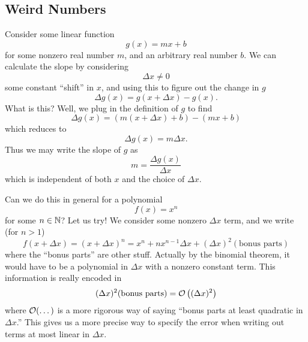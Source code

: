 
\subsection{Weird Numbers}

Consider some linear function
\begin{equation}
g(x)=mx+b
\end{equation}
for some nonzero real number $m$, and an arbitrary real number
$b$. We can calculate the slope by considering
\begin{equation}
 \Delta x\not=0
\end{equation}
some constant ``shift'' in $x$, and using this to figure out the
change in $g$
\begin{equation}
\Delta g(x)=g(x+\Delta x)-g(x).
\end{equation}
What is this? Well, we plug in the definition of $g$ to find
\begin{equation}
\Delta g(x)=(m(x+\Delta x)+b)-(mx+b)
\end{equation}
which reduces to 
\begin{equation}
\Delta g(x)=m\Delta x.
\end{equation}
Thus we may write the slope of $g$ as
\begin{equation}
m=\frac{\Delta g(x)}{\Delta x}
\end{equation}
which is independent of both $x$ and the choice of $\Delta x$.

Can we do this in general for a polynomial
\begin{equation}\label{eq:definitionOfF}
f(x)=x^{n}
\end{equation}
for some $n\in\mathbb{N}$? Let us try! We consider some nonzero $\Delta
x$ term, and we write (for $n>1$)
\begin{equation}
f(x+\Delta x)=(x+\Delta x)^{n}=x^{n}+nx^{n-1}\Delta
x+(\Delta x)^{2}(\mbox{bonus parts})
\end{equation}
where the ``bonus parts'' are other stuff. Actually by the binomial
theorem, it would have to be a polynomial in $\Delta x$ with a
nonzero constant term. This information is really encoded in
\begin{equation}
(\Delta x)^{2}(\mbox{bonus parts})=\mathcal{O}\left((\Delta x)^{2}\right)
\end{equation}
where $\mathcal{O}(\dots)$ is a more rigorous way of saying ``bonus
parts at least quadratic in $\Delta x$.'' This gives us a more
precise way to specify the error when writing out terms at most
linear in $\Delta x$.

